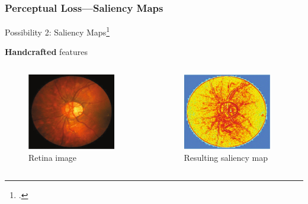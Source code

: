 \documentclass{beamer}
\begin{document}
\begin{frame}
  \frametitle{Perceptual Loss---Saliency Maps}
   Possibility 2: Saliency Maps\footcite{SaliencyGAN}

  \textbf{Handcrafted} features
\begin{columns}
  \begin{column}{0.5\linewidth}
    \begin{figure}[h]
      \centering
        \includegraphics[width=0.9\textwidth]{saliency_gt}
      \caption*{Retina image}
    \end{figure}
  \end{column}
  \begin{column}{0.5\linewidth}
    \begin{figure}[h]
      \centering
        \includegraphics[width=0.9\textwidth]{saliency_smap}
      \caption*{Resulting saliency map}
    \end{figure}
  \end{column} 
\end{columns}
\end{frame}
\end{document}
